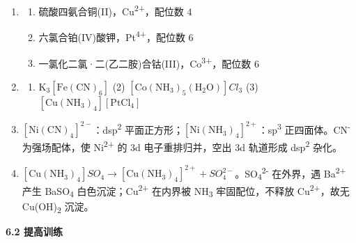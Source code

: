 \begin{enumerate}
\def\labelenumi{\arabic{enumi}.}
\item
  \begin{enumerate}
  \def\labelenumii{(\arabic{enumii})}
  \tightlist
  \item
    硫酸四氨合铜(II)，Cu\textsuperscript{2+}，配位数 4
  \item
    六氯合铂(IV)酸钾，Pt\textsuperscript{4+}，配位数 6
  \item
    一氯化二氯·二(乙二胺)合钴(III)，Co\textsuperscript{3+}，配位数 6
  \end{enumerate}
\item
  \begin{enumerate}
  \def\labelenumii{(\arabic{enumii})}
  \tightlist
  \item
    \(\mathrm{K_3[Fe(CN)_6]}\) (2) \([\mathrm{Co(NH_3)_5(H_2O)}]Cl_3\) (3) \([\mathrm{Cu(NH_3)_4}][\mathrm{PtCl_4}]\)
  \end{enumerate}
\item
  \([\mathrm{Ni(CN)_4}]^{2-}\)：dsp\textsuperscript{2} \箭 平面正方形；\([\mathrm{Ni(NH_3)_4}]^{2+}\)：sp\textsuperscript{3} \箭 正四面体。CN\textsuperscript{-} 为强场配体，使 Ni\textsuperscript{2+} 的 3d 电子重排归并，空出 3d 轨道形成 dsp\textsuperscript{2} 杂化。
\item
  \([\mathrm{Cu(NH_3)_4}]SO_4 \rightarrow [\mathrm{Cu(NH_3)_4}]^{2+} + SO_4^{2-}\)。SO\textsubscript{4}\textsuperscript{2-} 在外界，遇 Ba\textsuperscript{2+} 产生 BaSO\textsubscript{4} 白色沉淀；Cu\textsuperscript{2+} 在内界被 NH\textsubscript{3} 牢固配位，不释放 Cu\textsuperscript{2+}，故无 Cu(OH)\textsubscript{2} 沉淀。
\end{enumerate}

\textbf{6.2 提高训练}

